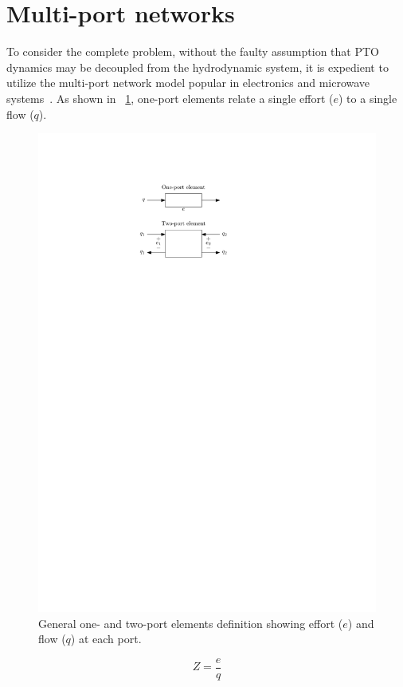 \documentclass[lettersize,journal]{IEEEtran}
\begin{document}
\section{Multi-port networks}\label{sec:multi_port_networks}
To consider the complete problem, without the faulty assumption that PTO dynamics may be decoupled from the hydrodynamic system, it is expedient to utilize the multi-port network model popular in electronics and microwave systems~\cite{Marrocco:2008aa}.
As shown in \figurename~\ref{fig:wec_as_multiport_general_one_two_ports}, one-port elements relate a single effort ($e$) to a single flow ($q$).

\begin{figure}[tb]
        \centering
        \includegraphics[width=0.75\columnwidth]{wec_as_multiport_general_one_two_ports.pdf}
        \caption{General one- and two-port elements definition showing effort ($e$) and flow ($q$) at each port.}
        \label{fig:wec_as_multiport_general_one_two_ports}
\end{figure}

\begin{equation}
        Z = \frac{e}{q}
\end{equation}
\end{document}
